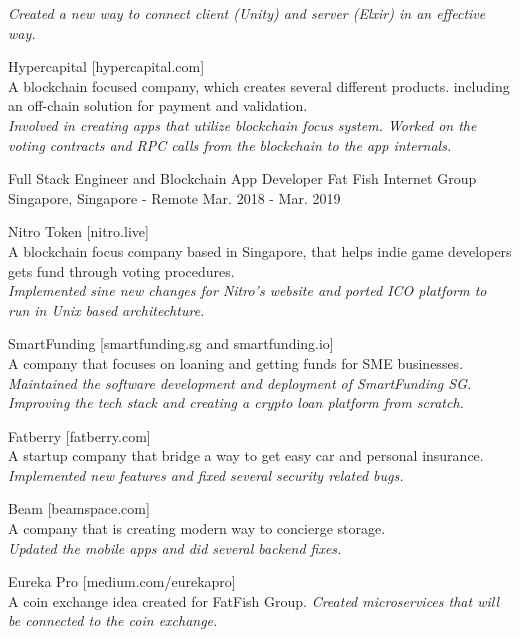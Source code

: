 \begin{cventries}
{\begin{cvitems}
{                    \emph{Created a new way to connect client (Unity) and server (Elxir) in an effective way.}}
                \item
                    {Hypercapital [hypercapital.com]\\
                    A blockchain focused company, which creates several different products. including an off-chain solution for payment and validation.\\
                    \emph{Involved in creating apps that utilize blockchain focus system. Worked on the voting contracts and RPC calls from the blockchain to the app internals.}}
            \end{cvitems}
        }

    \cventry
        {Full Stack Engineer and Blockchain App Developer}
        {Fat Fish Internet Group}
        {Singapore, Singapore - Remote}
        {Mar. 2018 - Mar. 2019}
        {
            \begin{cvitems}
                \item
                    {Nitro Token [nitro.live]\\
                    A blockchain focus company based in Singapore, that helps indie game developers gets fund through voting procedures.\\
                    \emph{Implemented sine new changes for Nitro's website and ported ICO platform to run in Unix based architechture.}}
                \item
                    {SmartFunding [smartfunding.sg and smartfunding.io]\\
                    A company that focuses on loaning and getting funds for SME businesses.\\
                    \emph{Maintained the software development and deployment of SmartFunding SG. Improving the tech stack and creating a crypto loan platform from scratch.}}
                \item
                    {Fatberry [fatberry.com]\\
                    A startup company that bridge a way to get easy car and personal insurance.\\
                    \emph{Implemented new features and fixed several security related bugs.}}
                \item
                    {Beam [beamspace.com]\\
                    A company that is creating modern way to concierge storage.\\
                    \emph{Updated the mobile apps and did several backend fixes.}}
                \item
                    {Eureka Pro [medium.com/eurekapro]\\
                    A coin exchange idea created for FatFish Group.
                    \emph{Created microservices that will be connected to the coin exchange.}}
            \end{cvitems}
        }


\end{cventries}
